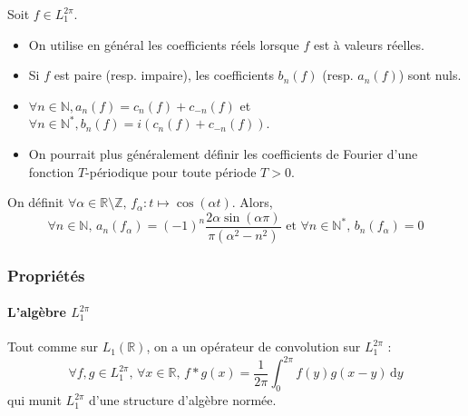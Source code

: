   \begin{remark}
    Soit $f \in L_1^{2\pi}$.
    \begin{itemize}
      \item On utilise en général les coefficients réels lorsque $f$ est à valeurs réelles.
      \item Si $f$ est paire (resp. impaire), les coefficients $b_n(f)$ (resp. $a_n(f)$) sont nuls.
      \item $\forall n \in \mathbb{N}, a_n(f) = c_n(f) + c_{-n}(f)$ et $\forall n \in \mathbb{N}^*, b_n(f) = i(c_n(f) + c_{-n}(f))$.
      \item On pourrait plus généralement définir les coefficients de Fourier d'une fonction $T$-périodique pour toute période $T > 0$.
    \end{itemize}
  \end{remark}


  \begin{example}
    On définit $\forall \alpha \in \mathbb{R} \setminus \mathbb{Z}, \, f_\alpha : t \mapsto \cos(\alpha t)$. Alors,
    \[ \forall n \in \mathbb{N}, \, a_n(f_\alpha) = (-1)^n \frac{2 \alpha \sin(\alpha \pi)}{\pi (\alpha^2 - n^2)} \text{ et } \forall n \in \mathbb{N}^*, \, b_n(f_\alpha) = 0 \]
  \end{example}

  \subsubsection{Propriétés}

  \paragraph{L'algèbre \texorpdfstring{$L_1^{2 \pi}$}{L₁²ᵖⁱ}}


  \begin{proposition}
    Tout comme sur $L_1(\mathbb{R})$, on a un opérateur de convolution sur $L_1^{2 \pi}$ :
    \[ \forall f, g \in L_1^{2 \pi}, \, \forall x \in \mathbb{R}, \, f*g(x) = \frac{1}{2 \pi} \int_0^{2\pi} f(y) g(x - y) \, \mathrm{d}y \]
    qui munit $L_1^{2 \pi}$ d'une structure d'algèbre normée.
  \end{proposition}


